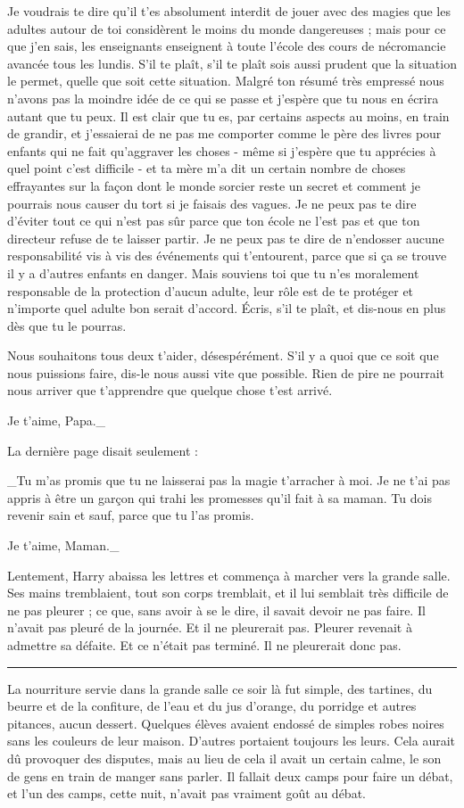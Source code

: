 Je voudrais te dire qu'il t'es absolument interdit de jouer avec des magies que les adultes autour de toi considèrent le moins du monde dangereuses ; mais pour ce que j'en sais, les enseignants enseignent à toute l'école des cours de nécromancie avancée tous les lundis. S'il te plaît, s'il te plaît sois aussi prudent que la situation le permet, quelle que soit cette situation. Malgré ton résumé très empressé nous n'avons pas la moindre idée de ce qui se passe et j'espère que tu nous en écrira autant que tu peux. Il est clair que tu es, par certains aspects au moins, en train de grandir, et j'essaierai de ne pas me comporter comme le père des livres pour enfants qui ne fait qu'aggraver les choses - même si j'espère que tu apprécies à quel point c'est difficile - et ta mère m'a dit un certain nombre de choses effrayantes sur la façon dont le monde sorcier reste un secret et comment je pourrais nous causer du tort si je faisais des vagues. Je ne peux pas te dire d'éviter tout ce qui n'est pas sûr parce que ton école ne l'est pas et que ton directeur refuse de te laisser partir. Je ne peux pas te dire de n'endosser aucune responsabilité vis à vis des événements qui t'entourent, parce que si ça se trouve il y a d'autres enfants en danger. Mais souviens toi que tu n'es moralement responsable de la protection d'aucun adulte, leur rôle est de te protéger et n'importe quel adulte bon serait d'accord. Écris, s'il te plaît, et dis-nous en plus dès que tu le pourras.

Nous souhaitons tous deux t'aider, désespérément. S'il y a quoi que ce soit que nous puissions faire, dis-le nous aussi vite que possible. Rien de pire ne pourrait nous arriver que t'apprendre que quelque chose t'est arrivé.

Je t'aime, Papa.\_

La dernière page disait seulement :

\_Tu m'as promis que tu ne laisserai pas la magie t'arracher à moi. Je ne t'ai pas appris à être un garçon qui trahi les promesses qu'il fait à sa maman. Tu dois revenir sain et sauf, parce que tu l'as promis.

Je t'aime, Maman.\_

Lentement, Harry abaissa les lettres et commença à marcher vers la grande salle. Ses mains tremblaient, tout son corps tremblait, et il lui semblait très difficile de ne pas pleurer ; ce que, sans avoir à se le dire, il savait devoir ne pas faire. Il n'avait pas pleuré de la journée. Et il ne pleurerait pas. Pleurer revenait à admettre sa défaite. Et ce n'était pas terminé. Il ne pleurerait donc pas.
\par\noindent\rule{\textwidth}{0.4pt}
La nourriture servie dans la grande salle ce soir là fut simple, des tartines, du beurre et de la confiture, de l'eau et du jus d'orange, du porridge et autres pitances, aucun dessert. Quelques élèves avaient endossé de simples robes noires sans les couleurs de leur maison. D'autres portaient toujours les leurs. Cela aurait dû provoquer des disputes, mais au lieu de cela il avait un certain calme, le son de gens en train de manger sans parler. Il fallait deux camps pour faire un débat, et l'un des camps, cette nuit, n'avait pas vraiment goût au débat.

